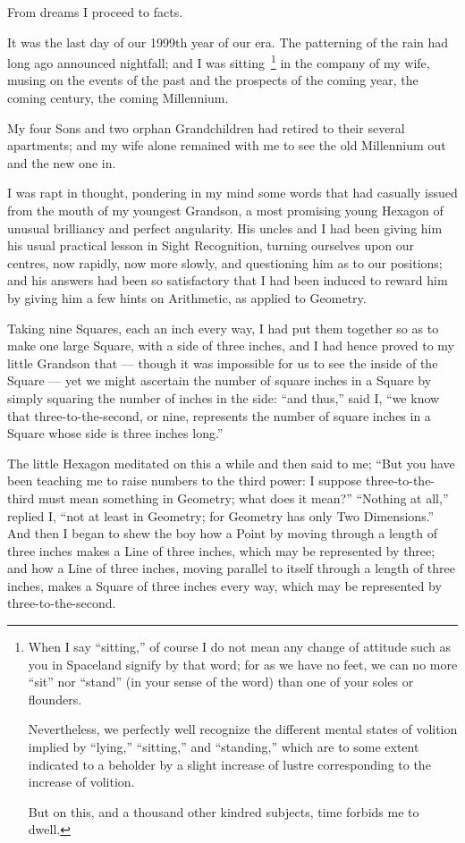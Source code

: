 \documentclass[10pt, kindle, oneside]{kindle}
\begin{document}
From dreams I proceed to facts.

It was the last day of our 1999th year of our era. The patterning of the rain
had long ago announced nightfall; and I was sitting~\footnote{When I say
``sitting,'' of course I do not mean any change of attitude such as you in
Spaceland signify by that word; for as we have no feet, we can no more ``sit''
nor ``stand'' (in your sense of the word) than one of your soles or flounders.

Nevertheless, we perfectly well recognize the different mental states of
volition implied by ``lying,'' ``sitting,'' and ``standing,'' which are to some
extent indicated to a beholder by a slight increase of lustre corresponding to
the increase of volition.

But on this, and a thousand other kindred subjects, time forbids me to dwell.}
in the company of my wife, musing on the events of the past and the prospects
of the coming year, the coming century, the coming Millennium.

My four Sons and two orphan Grandchildren had retired to their several
apartments; and my wife alone remained with me to see the old Millennium out
and the new one in.

I was rapt in thought, pondering in my mind some words that had casually
issued from the mouth of my youngest Grandson, a most promising young Hexagon
of unusual brilliancy and perfect angularity. His uncles and I had been giving
him his usual practical lesson in Sight Recognition, turning ourselves upon
our centres, now rapidly, now more slowly, and questioning him as to our
positions; and his answers had been so satisfactory that I had been induced to
reward him by giving him a few hints on Arithmetic, as applied to Geometry.

Taking nine Squares, each an inch every way, I had put them together so as to
make one large Square, with a side of three inches, and I had hence proved to
my little Grandson that --- though it was impossible for us to see the inside of
the Square --- yet we might ascertain the number of square inches in a Square by
simply squaring the number of inches in the side: ``and thus,'' said I, ``we know
that three-to-the-second, or nine, represents the number of square inches in a
Square whose side is three inches long.''

The little Hexagon meditated on this a while and then said to me; ``But you
have been teaching me to raise numbers to the third power: I suppose
three-to-the-third must mean something in Geometry; what does it mean?''
``Nothing at all,'' replied I, ``not at least in Geometry; for Geometry has only
Two Dimensions.'' And then I began to shew the boy how a Point by moving
through a length of three inches makes a Line of three inches, which may be
represented by three; and how a Line of three inches, moving parallel to
itself through a length of three inches, makes a Square of three inches every
way, which may be represented by three-to-the-second.
\end{document}
